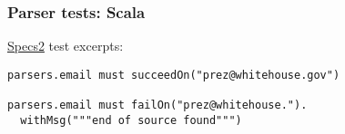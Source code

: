 \begin{frame}[fragile]
  \frametitle{Parser tests: Scala}

  \href{http://etorreborre.github.io/specs2/}{Specs2} test excerpts:

  \begin{verbatim}
parsers.email must succeedOn("prez@whitehouse.gov")

parsers.email must failOn("prez@whitehouse.").
  withMsg("""end of source found""")
  \end{verbatim}
\end{frame}
